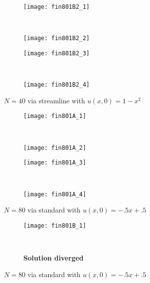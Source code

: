 \documentclass[10pt,letterpaper,fleqn]{article}
\begin{document}
\begin{figure}[h!]
        \centering
        \begin{subfigure}[b]{0.4\textwidth}
                \texttt{[image: fin801B2\_1]}
        \end{subfigure}%
        ~ 
        \begin{subfigure}[b]{0.4\textwidth}
                \texttt{[image: fin801B2\_2]}
        \end{subfigure}
        
        \begin{subfigure}[b]{0.4\textwidth}
                \texttt{[image: fin801B2\_3]}
        \end{subfigure}
        ~
        \begin{subfigure}[b]{0.4\textwidth}
                \texttt{[image: fin801B2\_4]}
        \end{subfigure}
        \caption{$N = 40$ via streamline with $u(x,0) = 1 - x^2$}
\end{figure}

\begin{figure}[h!]
        \centering
        \begin{subfigure}[b]{0.4\textwidth}
                \texttt{[image: fin801A\_1]}
        \end{subfigure}%
        ~ 
        \begin{subfigure}[b]{0.4\textwidth}
                \texttt{[image: fin801A\_2]}
        \end{subfigure}
        
        \begin{subfigure}[b]{0.4\textwidth}
                \texttt{[image: fin801A\_3]}
        \end{subfigure}
        ~
        \begin{subfigure}[b]{0.4\textwidth}
                \texttt{[image: fin801A\_4]}
        \end{subfigure}
        \caption{$N = 80$ via standard with $u(x,0) = -.5x + .5$}
\end{figure}

\begin{figure}[h!]
        \centering
        \begin{subfigure}[b]{0.4\textwidth}
                \texttt{[image: fin801B\_1]}
        \end{subfigure}%
        ~ 
        \begin{subfigure}[b]{0.4\textwidth}
        \textbf{Solution diverged}
        \end{subfigure}
        
        \caption{$N = 80$ via standard with $u(x,0) = -.5x + .5$}
\end{figure}
\end{document}
